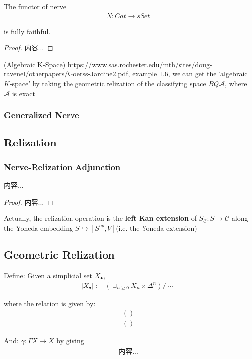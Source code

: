 \documentclass[Total.tex]{subfiles}
\begin{document}
				\begin{proposition}
					The functor of nerve
					\begin{gather*}
						N:Cat\rightarrow sSet
					\end{gather*}
					
					is fully faithful.
				\end{proposition}
				\begin{proof}
					内容...
				\end{proof}
				
				\begin{example}
					(Algebraic K-Space) \url{https://www.sas.rochester.edu/mth/sites/doug-ravenel/otherpapers/Goerss-Jardine2.pdf}, example 1.6, we can get the 'algebraic $K$-space' by taking the geometric relization of the classifying space $BQ\mathcal{A}$, where $\mathcal{A}$ is exact.
				\end{example}
				\subsubsection{Generalized Nerve}
				
				\subsection{Relization }
				
				\subsubsection{Nerve-Relization Adjunction}
				
				\begin{theorem}
					内容...
				\end{theorem}
				\begin{proof}
					内容...
				\end{proof}
				
				
				Actually, the relization operation is the  \textbf{left Kan extension} of $S_\mathcal{C}:S\rightarrow \mathcal{C}$ along the Yoneda embedding $S\hookrightarrow [S^{op},V]$(i.e. the Yoneda extension)
			\subsection{Geometric Relization}
				\begin{Def}
					Define: Given a simplicial set $X_\bullet$,
					\begin{gather*}
						|X_\bullet|:=(\sqcup_{n\geq 0} X_n\times \Delta^n)/\sim
					\end{gather*}
					
					where the relation is given by:
					\begin{gather*}
						()\\
						()
					\end{gather*}
					
					And: $\gamma:\Gamma X\rightarrow X$ by giving
					\begin{gather*}
						内容...
					\end{gather*}
				\end{Def}
				
\end{document}
